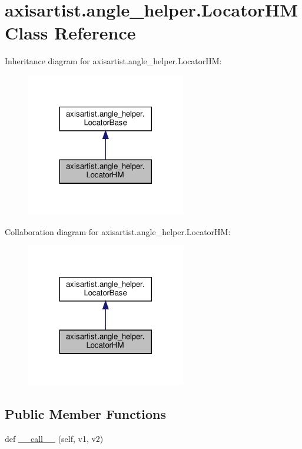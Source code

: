 \hypertarget{classaxisartist_1_1angle__helper_1_1LocatorHM}{}\section{axisartist.\+angle\+\_\+helper.\+Locator\+HM Class Reference}
\label{classaxisartist_1_1angle__helper_1_1LocatorHM}


Inheritance diagram for axisartist.\+angle\+\_\+helper.\+Locator\+HM\+:
\nopagebreak
\begin{figure}[H]
\begin{center}
\leavevmode
\includegraphics[width=197pt]{classaxisartist_1_1angle__helper_1_1LocatorHM__inherit__graph}
\end{center}
\end{figure}


Collaboration diagram for axisartist.\+angle\+\_\+helper.\+Locator\+HM\+:
\nopagebreak
\begin{figure}[H]
\begin{center}
\leavevmode
\includegraphics[width=197pt]{classaxisartist_1_1angle__helper_1_1LocatorHM__coll__graph}
\end{center}
\end{figure}
\subsection*{Public Member Functions}
\begin{DoxyCompactItemize}
\item 
def \hyperlink{classaxisartist_1_1angle__helper_1_1LocatorHM_ac9a70b8f08bb5e9fceb101e0d5a2673c}{\+\_\+\+\_\+call\+\_\+\+\_\+} (self, v1, v2)
\end{DoxyCompactItemize}
